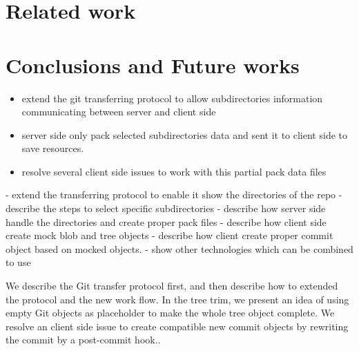 \documentclass[preprint]{sigplanconf}
\begin{document}
\section{Related work}

\section{Conclusions and Future works}


\begin{itemize}
  \item  extend the git transferring protocol to allow subdirectories information communicating between server and client side
  \item server side only pack selected subdirectories data and sent it to client side to save resources.
  \item resolve several client side issues to work with this partial pack data files
\end{itemize}

  - extend the transferring protocol to enable it show the directories of the repo
  - describe the steps to select specific subdirectories
  - describe how server side handle the directories and create proper pack files
  - describe how client side create mock blob and tree objects 
  - describe how client create proper commit object based on mocked objects.
- show other technologies which can be combined to use 

We describe the Git transfer protocol first, and then describe how to extended the protocol and the new work flow.
In the tree trim, we present an idea of using empty Git objects as placeholder to make the whole tree object complete.
We resolve an client side issue to create compatible new commit objects by rewriting the commit by a post-commit hook..
\end{document}
